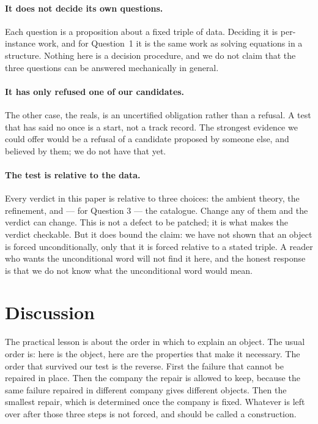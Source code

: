 \documentclass[aps,prd,preprint,superscriptaddress,amsmath,amssymb]{revtex4-2}
\begin{document}
\paragraph{It does not decide its own questions.}
Each question is a proposition about a fixed triple of data.  Deciding it is
per-instance work, and for Question~1 it is the same work as solving equations in
a structure.  Nothing here is a decision procedure, and we do not claim that the
three questions can be answered mechanically in general.

\paragraph{It has only refused one of our candidates.}
The other case, the reals, is an uncertified obligation rather than a refusal.  A
test that has said no once is a start, not a track record.  The strongest evidence
we could offer would be a refusal of a candidate proposed by someone else, and
believed by them; we do not have that yet.

\paragraph{The test is relative to the data.}
Every verdict in this paper is relative to three choices: the ambient theory, the
refinement, and --- for Question 3 --- the catalogue.  Change any of them and the
verdict can change.  This is not a defect to be patched; it is what makes the
verdict checkable.  But it does bound the claim: we have not shown that an object
is forced unconditionally, only that it is forced relative to a stated triple.  A
reader who wants the unconditional word will not find it here, and the honest
response is that we do not know what the unconditional word would mean.

\section{Discussion}
\label{sec:discussion}

The practical lesson is about the order in which to explain an object.  The usual
order is: here is the object, here are the properties that make it necessary.  The
order that survived our test is the reverse.  First the failure that cannot be
repaired in place.  Then the company the repair is allowed to keep, because the
same failure repaired in different company gives different objects.  Then the
smallest repair, which is determined once the company is fixed.  Whatever is left
over after those three steps is not forced, and should be called a construction.
\end{document}
